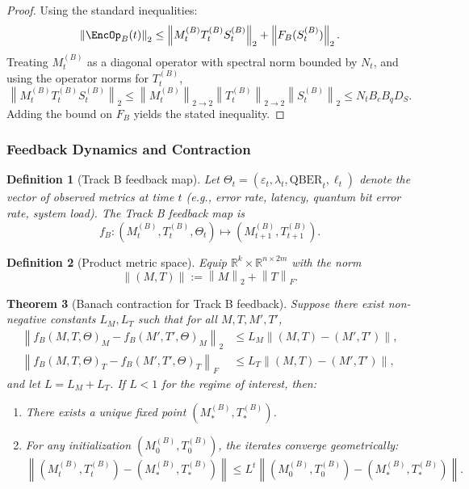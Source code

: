\documentclass[11pt]{article}
\newtheorem{definition}{Definition}[section]
\newtheorem{theorem}[definition]{Theorem}
\newcommand{\R}{\mathbb{R}}
\newcommand{\norm}[1]{\left\lVert #1 \right\rVert}
\begin{document}
\begin{proof}
Using the standard inequalities:
\[
  \norm{\EncOp_B(t)}_2 \le \norm{M_t^{(B)} T_t^{(B)} S_t^{(B)}}_2 + \norm{F_B(S_t^{(B)})}_2.
\]
Treating \(M_t^{(B)}\) as a diagonal operator with spectral norm bounded by \(N_t\), and using the operator norms for \(T_t^{(B)}\),
\[
  \norm{M_t^{(B)} T_t^{(B)} S_t^{(B)}}_2 \le \norm{M_t^{(B)}}_{2\to 2} \norm{T_t^{(B)}}_{2\to 2} \norm{S_t^{(B)}}_2 \le N_t B_c B_q D_S.
\]
Adding the bound on \(F_B\) yields the stated inequality.
\end{proof}

\subsubsection{Feedback Dynamics and Contraction}

\begin{definition}[Track B feedback map]
Let \(\Theta_t = (\varepsilon_t, \lambda_t, \mathrm{QBER}_t, \ell_t)\) denote the vector of observed metrics at time \(t\) (e.g., error rate, latency, quantum bit error rate, system load).
The Track B feedback map is
\[
  f_B : (M_t^{(B)}, T_t^{(B)}, \Theta_t) \mapsto (M_{t+1}^{(B)}, T_{t+1}^{(B)}).
\]
\end{definition}

\begin{definition}[Product metric space]
Equip \(\R^k \times \R^{n\times 2m}\) with the norm
\[
  \norm{(M,T)} := \norm{M}_2 + \norm{T}_F.
\]
\end{definition}

\begin{theorem}[Banach contraction for Track B feedback]
Suppose there exist non-negative constants \(L_M, L_T\) such that for all \(M,T,M',T'\),
\begin{align*}
  \norm{f_B(M,T,\Theta)_M - f_B(M',T',\Theta)_M}_2 &\le L_M \norm{(M,T)-(M',T')}, \\
  \norm{f_B(M,T,\Theta)_T - f_B(M',T',\Theta)_T}_F &\le L_T \norm{(M,T)-(M',T')},
\end{align*}
and let \(L = L_M + L_T\).
If \(L < 1\) for the regime of interest, then:
\begin{enumerate}[leftmargin=1.5em]
  \item There exists a unique fixed point \((M_\ast^{(B)}, T_\ast^{(B)})\).
  \item For any initialization \((M_0^{(B)}, T_0^{(B)})\), the iterates converge geometrically:
  \[
    \norm{(M_t^{(B)}, T_t^{(B)}) - (M_\ast^{(B)}, T_\ast^{(B)})} \le L^t \norm{(M_0^{(B)}, T_0^{(B)}) - (M_\ast^{(B)}, T_\ast^{(B)})}.
  \]
\end{enumerate}
\end{theorem}
\end{document}
